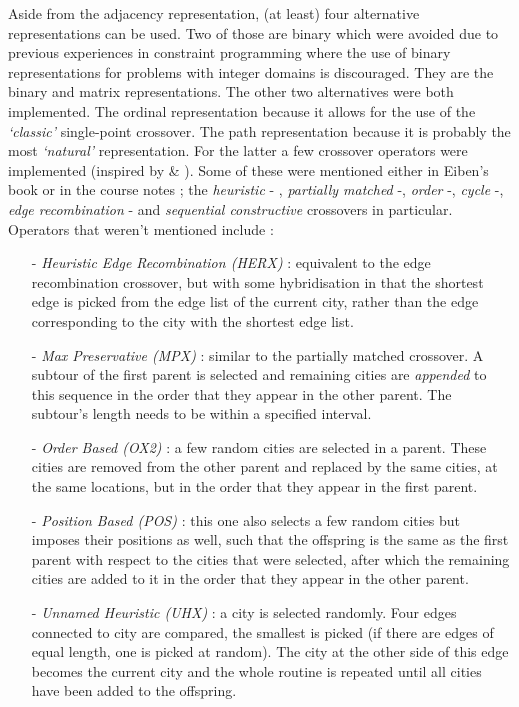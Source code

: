 Aside from the adjacency representation, (at least) four alternative representations can be used. Two of those are binary which were avoided due to previous experiences in constraint programming where the use of binary representations for problems with integer domains is discouraged. They are the binary and matrix representations. The other two alternatives were both implemented. The ordinal representation because it allows for the use of the \textit{`classic'} single-point crossover. The path representation because it is probably the most \textit{`natural'} representation. For the latter a few crossover operators were implemented (inspired by \cite{larraaga} \& \cite{imskhan}). Some of these were mentioned either in Eiben's book or in the course notes ; the \textit{heuristic} - , \textit{partially matched} -, \textit{order} -, \textit{cycle} -, \textit{edge recombination} - and \textit{sequential constructive} crossovers in particular. Operators that weren't mentioned include : 
\begin{itemize}
\item[-] \textit{Heuristic Edge Recombination (HERX)} : equivalent to the edge recombination crossover, but with some hybridisation in that the shortest edge is picked from the edge list of the current city, rather than the edge corresponding to the city with the shortest edge list.
\item[-] \textit{Max Preservative (MPX)} : similar to the partially matched crossover. A subtour of the first parent is selected and remaining cities are \textit{appended} to this sequence in the order that they appear in the other parent. The subtour's length needs to be within a specified interval.
\item[-] \textit{Order Based (OX2)} : a few random cities are selected in a parent. These cities are removed from the other parent and replaced by the same cities, at the same locations, but in the order that they appear in the first parent.
\item[-] \textit{Position Based (POS)} : this one also selects a few random cities but imposes their positions as well, such that the offspring is the same as the first parent with respect to the cities that were selected, after which the remaining cities are added to it in the order that they appear in the other parent.
\item[-] \textit{Unnamed Heuristic (UHX)} : a city is selected randomly. Four edges connected to city are compared, the smallest is picked (if there are edges of equal length, one is picked at random). The city at the other side of this edge becomes the current city and the whole routine is repeated until all cities have been added to the offspring.
\end{itemize}
